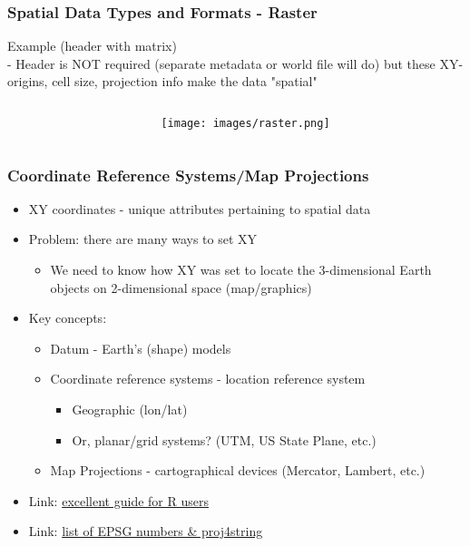\documentclass[11pt]{beamer}
\begin{document}
\begin{frame}
\frametitle{Spatial Data Types and Formats - Raster}
Example (header with matrix)
\\ - Header is NOT required (separate metadata or world file will do) but these XY-origins, cell size, projection info make the data "spatial"
\begin{columns}
\begin{column}{5cm}

\end{column}
\begin{column}{5cm}
\begin{figure}
\texttt{[image: images/raster.png]}
\end{figure}
\end{column}
\end{columns}
\end{frame}

\begin{frame}
\frametitle{Coordinate Reference Systems/Map Projections}
\begin{itemize}
\item XY coordinates - unique attributes pertaining to spatial data
\item Problem: there are many ways to set XY
\begin{itemize}
\item We need to know how XY was set to locate the 3-dimensional Earth objects on 2-dimensional space (map/graphics)
\end{itemize}
\item Key concepts:
\begin{itemize}
\item Datum - Earth's (shape) models
\item Coordinate reference systems - location reference system
\begin{itemize}
\item Geographic (lon/lat)
\item Or, planar/grid systems? (UTM, US State Plane, etc.)
\end{itemize}
\item Map Projections - cartographical devices (Mercator, Lambert, etc.)
\end{itemize}
\item Link:  \href{https://www.nceas.ucsb.edu/~frazier/RSpatialGuides/OverviewCoordinateReferenceSystems.pdf}{excellent guide for R users}
\item Link: 
\href{https://r-forge.r-project.org/scm/viewvc.php/trunk/inst/proj/epsg?view=markup&revision=91&root=rgdal&diff_format=h&pathrev=93}{list of EPSG numbers \& proj4string}
\end{itemize}
\end{frame}
\end{document}

